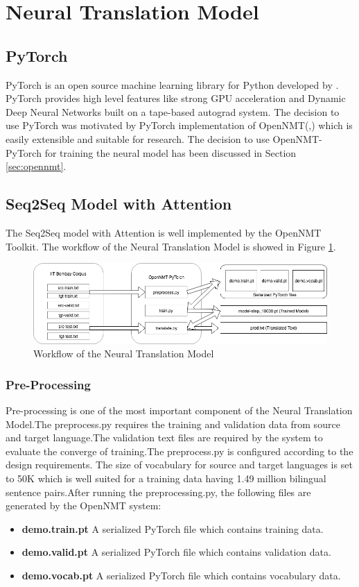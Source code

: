 \section{Neural Translation Model}
\subsection{PyTorch}
PyTorch is an open source machine learning library for Python developed by \cite{paszke2017automatic}. PyTorch provides high level features like strong GPU acceleration and Dynamic Deep Neural Networks  built on a tape-based autograd system. The decision to use PyTorch was motivated by PyTorch implementation of OpenNMT(\citeauthor{opennmt},\citeyear{opennmt}) which is easily extensible and suitable for research. The decision to use OpenNMT-PyTorch for training the neural model has been discussed in Section \ref{sec:opennmt}.
\subsection{Seq2Seq Model with Attention}
The Seq2Seq model with Attention is well implemented by the OpenNMT Toolkit. The workflow of the Neural Translation Model is showed in Figure \ref{nmtwork}.

\begin{figure}
\includegraphics[width=\textwidth]{figures/nmtworkflow.png}
\caption{Workflow of the Neural Translation Model} 
\label{nmtwork}
\end{figure}

\subsubsection{Pre-Processing} 
Pre-processing is one of the most important component of the Neural Translation Model.The preprocess.py requires the training and validation data from source and target language.The validation text files are required by the system to evaluate the converge of training.The preprocess.py is configured according to the design requirements. The size of vocabulary for source and target languages is set to 50K which is well suited for a training data having 1.49 million bilingual sentence pairs.After running the preprocessing.py, the following files are generated by the OpenNMT system:
\begin{itemize}
    \item \textbf{demo.train.pt} A serialized PyTorch file which contains training data.
    \item \textbf{demo.valid.pt} A serialized PyTorch file which contains validation data.
    \item \textbf{demo.vocab.pt} A serialized PyTorch file which contains vocabulary data.
\end{itemize}

